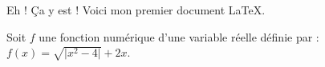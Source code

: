 \documentclass[a4paper,12pt]{report}
\newcommand{\abs}[1]{\lvert#1\rvert}%
\begin{document}
Eh ! Ça y est ! Voici mon premier document \LaTeX. 

Soit $f$ une fonction numérique d'une variable
réelle définie par : $f(x)=\sqrt{\abs{x^2-4}}+2x$.
\end{document}
